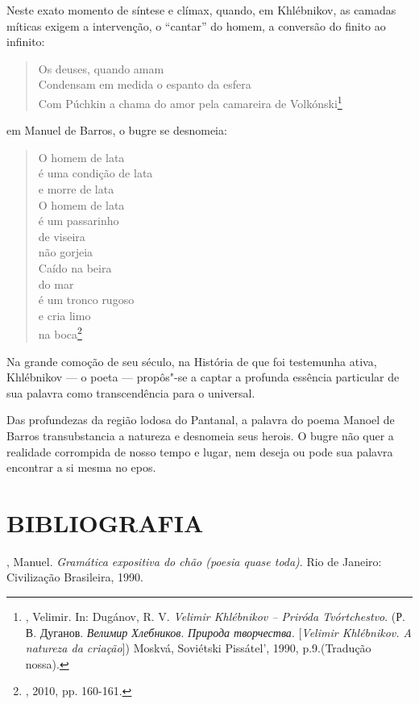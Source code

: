 Neste exato momento de síntese e clímax, quando, em Khlébnikov, as
camadas míticas exigem a intervenção, o ``cantar'' do homem, a conversão
do finito ao infinito:

\begin{verse}
Os deuses, quando amam \\
Condensam em medida o espanto da esfera \\
Com Púchkin a chama do amor pela \qb{}camareira de Volkónski\footnote{,
  Velimir. In: Dugánov, R. V. \emph{Velimir Khlébnikov -- Priróda
  Tvórtchestvo}. (Р. В. Дуганов. \emph{Велимир Хлебников}. \emph{Природа
  творчества}. [\emph{Velimir Khlébnikov. A natureza da criação}])
  Moskvá, Soviétski Pissátel', 1990, p.9.(Tradução nossa).}
\end{verse}

em Manuel de Barros, o bugre se desnomeia:

\begin{verse}
O homem de lata \\
é uma condição de lata \\
e morre de lata \\[8pt]
O homem de lata \\
é um passarinho \\
de viseira \\
não gorjeia \\[8pt]
Caído na beira \\
do mar \\
é um tronco rugoso \\
e cria limo \\
na boca\footnote{, 2010, pp. 160-161.}
\end{verse}

Na grande comoção de seu século, na História de que foi testemunha
ativa, Khlébnikov --- o poeta --- propôs"-se a captar a profunda essência
particular de sua palavra como transcendência para o universal.

Das profundezas da região lodosa do Pantanal, a palavra do poema Manoel
de Barros transubstancia a natureza e desnomeia seus herois. O bugre não
quer a realidade corrompida de nosso tempo e lugar, nem deseja ou pode
sua palavra encontrar a si mesma no epos.

\section{BIBLIOGRAFIA}

, Manuel. \emph{Gramática expositiva do chão (poesia quase toda)}.
Rio de Janeiro: Civilização Brasileira, 1990.

